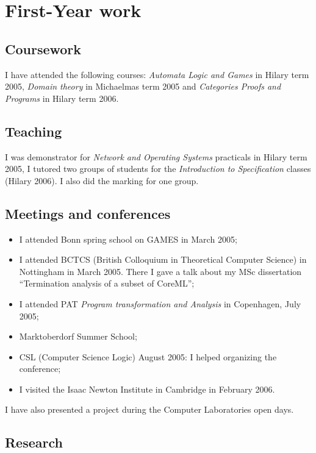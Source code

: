\chapter{First-Year work}

\section{Coursework}
I have attended the following courses: \emph{Automata Logic and
Games} in Hilary term 2005, \emph{Domain theory} in Michaelmas term
2005 and \emph{Categories Proofs and Programs} in Hilary term 2006.

\section{Teaching}

I was demonstrator for \emph{Network and Operating Systems}
practicals in Hilary term 2005, I tutored two groups of students for
the \emph{Introduction to Specification} classes (Hilary 2006). I
also did the marking for one group.

\section{Meetings and conferences}
\begin{itemize}
\item I attended Bonn spring school on GAMES in March 2005;

\item  I attended BCTCS (British Colloquium in
Theoretical Computer Science) in Nottingham in March 2005. There I
gave a talk about my MSc dissertation ``Termination analysis of a
subset of CoreML'';

\item I attended PAT \emph{Program transformation and Analysis} in Copenhagen, July 2005;

\item Marktoberdorf Summer School;
\item CSL (Computer Science Logic) August 2005:
I helped organizing the conference;
\item I visited the Isaac Newton Institute in Cambridge in February
2006.
\end{itemize}
I have also presented a project during the Computer Laboratories
open days.


\section{Research}

